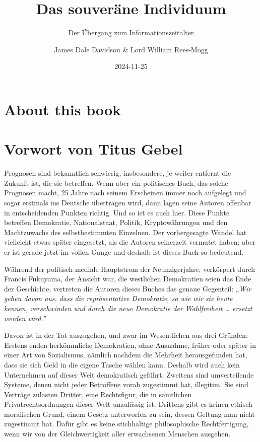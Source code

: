 \documentclass[
  a5paper,
  smalldemyvopaper,10pt,twoside,onecolumn,openright,extrafontsizes,hidelinks]{memoir}
\title{Das souveräne Individuum}
\subtitle{Der Übergang zum Informationszeitalter}
\author{James Dale Davidson \& Lord William Rees-Mogg}
\date{2024-11-25}
\renewcommand*\contentsname{Inhaltsverzeichnis}
\newcommand\contentsname{Inhaltsverzeichnis}
\begin{document}
\frontmatter
\maketitle

\renewcommand*\contentsname{Inhalt}
{
\setcounter{tocdepth}{0}
\tableofcontents
}

\mainmatter
{}

\chapter*{About this book}\label{about-this-book}



\chapter*{Vorwort von Titus Gebel}\label{vorwort-von-titus-gebel}


Prognosen sind bekanntlich schwierig, insbesondere, je weiter entfernt
die Zukunft ist, die sie betreffen. Wenn aber ein politisches Buch, das
solche Prognosen macht, 25 Jahre nach seinem Erscheinen immer noch
aufgelegt und sogar erstmals ins Deutsche übertragen wird, dann lagen
seine Autoren offenbar in entscheidenden Punkten richtig. Und so ist es
auch hier. Diese Punkte betreffen Demokratie, Nationalstaat, Politik,
Kryptowährungen und den Machtzuwachs des selbstbestimmten Einzelnen. Der
vorhergesagte Wandel hat vielleicht etwas später eingesetzt, als die
Autoren seinerzeit vermutet haben; aber er ist gerade jetzt im vollen
Gange und deshalb ist dieses Buch so bedeutend.

Während der politisch-mediale Hauptstrom der Neunzigerjahre, verkörpert
durch Francis Fukuyama, der Ansicht war, die westlichen Demokratien
seien das Ende der Geschichte, vertreten die Autoren dieses Buches das
genaue Gegenteil: „\emph{Wir gehen davon aus, dass die repräsentative
Demokratie, so wie wir sie heute kennen, verschwinden und durch die neue
Demokratie der Wahlfreiheit \ldots{} ersetzt werden wird.''}

Davon ist in der Tat auszugehen, und zwar im Wesentlichen aus drei
Gründen: Erstens enden herkömmliche Demokratien, ohne Ausnahme, früher
oder später in einer Art von Sozialismus, nämlich nachdem die Mehrheit
herausgefunden hat, dass sie sich Geld in die eigene Tasche wählen kann.
Deshalb wird auch kein Unternehmen auf dieser Welt demokratisch geführt.
Zweitens sind umverteilende Systeme, denen nicht jeder Betroffene vorab
zugestimmt hat, illegitim. Sie sind Verträge zulasten Dritter, eine
Rechtsfigur, die in sämtlichen Privatrechtsordnungen dieser Welt
unzulässig ist. Drittens gibt es keinen ethisch-moralischen Grund, einem
Gesetz unterworfen zu sein, dessen Geltung man nicht zugestimmt hat.
Dafür gibt es keine stichhaltige philosophische Rechtfertigung, wenn wir
von der Gleichwertigkeit aller erwachsenen Menschen ausgehen.
\end{document}
